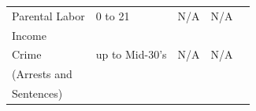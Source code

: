 \documentclass[static]{JJH-Beamer}
\begin{document}
\begin{frame}
\begin{table}[H]
\begin{center}
{\begin{tabular}{lllll}
Parental Labor & 0 to 21   & N/A & N/A  \\
     Income        &   &       &   \\ \midrule

Crime              & up to Mid-30's & N/A & N/A   \\
(Arrests and    & & & \\
 Sentences)    & & & \\ \bottomrule
\end{tabular}
}
\end{center}
\end{table}

\end{frame}
\end{document}
